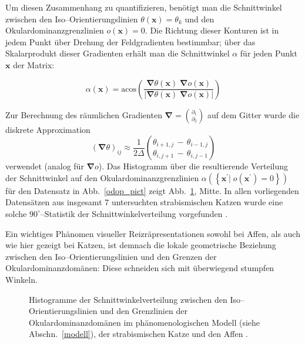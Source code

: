 Um diesen Zusammenhang zu quantifizieren, benötigt man die Schnittwinkel
zwischen den Iso--Orientierungslinien $\theta(\mathbf{x})=\theta_k$ und den
Okulardominanzgrenzlinien $o(\mathbf{x}) = 0$.  Die Richtung dieser
Konturen ist in jedem Punkt über Drehung der Feldgradienten bestimmbar;
über das Skalarprodukt dieser Gradienten erhält man die Schnittwinkel
$\alpha$ für jeden Punkt $\mathbf{x}$ der Matrix:

\begin{equation*}
\alpha(\mathbf{x})=\text{acos}\!\left(\frac{\pmb\nabla\theta(\mathbf{x})
\;\pmb\nabla o(\mathbf{x})}{\vert\pmb\nabla\theta(\mathbf{x})\;\pmb\nabla
o(\mathbf{x})\vert}\right)
\end{equation*}

Zur Berechnung des räumlichen Gradienten $\pmb\nabla =
{\binom{\partial_1}{\partial_2}}$ auf dem Gitter wurde die diskrete
Approximation
\begin{equation*}
(\pmb\nabla\theta)_{ij}\approx\frac{1}{2\Delta}{\binom{\theta_{i+1,j}\,-\,\theta_{i-1,j}}{\theta_{i,j+1}\,-\,\theta_{i,j-1}}}
\end{equation*}
verwendet (analog für $\pmb\nabla o$). Das Histogramm über die
resultierende Verteilung der Schnittwinkel auf den
Okulardominanzgrenzlinien $\alpha(\left\{\mathbf{x}^\prime\vert\;
o(\mathbf{x}^\prime)=0\right\})$ für den Datensatz in Abb.~\ref{odop_pict}
zeigt Abb.~\ref{odop_hist}, Mitte. In allen vorliegenden Datensätzen aus
insgesamt 7 untersuchten strabismischen Katzen wurde eine solche
$90^\circ$--Statistik der Schnittwinkelverteilung vorgefunden
\parencite[siehe][]{loewel:1996}.

Ein wichtiges Phänomen visueller Reizräpresentationen sowohl bei Affen,
als auch wie hier gezeigt bei Katzen, ist demnach die lokale geometrische
Beziehung zwischen den Iso--Orientierungslinien und den Grenzen der
Okulardominanzdomänen: Diese schneiden sich mit überwiegend stumpfen
Winkeln.

\begin{figure}[t]
\centering
{}
\caption{Histogramme der Schnittwinkelverteilung zwischen den
Iso--Orien\-tier\-ungs\-linien und den Grenzlinien der Okulardominanzdomänen
im phänomenologischen Modell (siehe Abschn.~\ref{modell}), der
strabismischen Katze \parencite[hier für den in Abb.~\ref{odop_pict} gezeigten Datensatz; weitere siehe][]{loewel:1996} und den Affen
\parencite[Daten aus][]{oby:1993b}.}
\label{odop_hist}
\end{figure}

